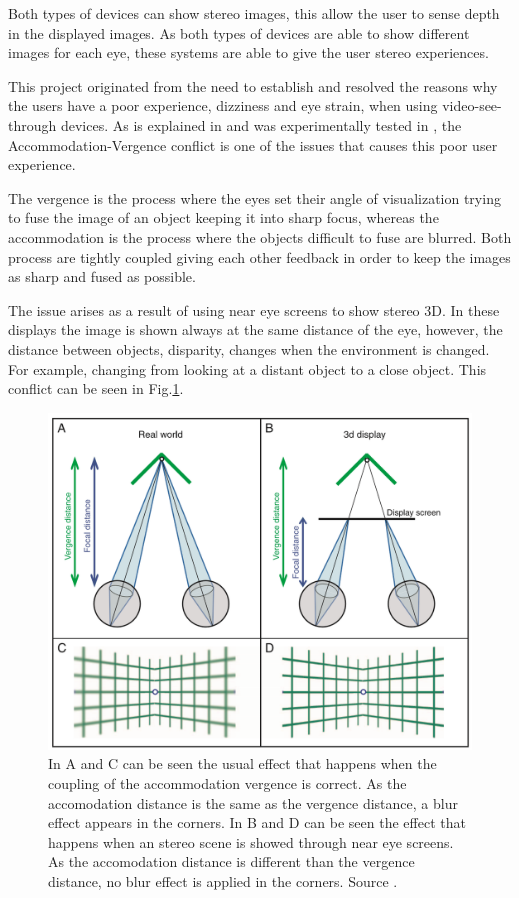 \documentclass[10pt,a4paper,twocolumn,twoside]{article}
\begin{document}
	Both types of devices can show stereo images, this allow the user to sense depth in the displayed images. 
	As both types of devices are able to show different images for each eye, these systems are able to give the user stereo experiences. 
	
	This project originated from the need to establish and resolved the reasons why the users have a poor experience, dizziness and eye strain, when using video-see-through devices. As is explained in \cite{disconfortReview} and was experimentally tested in \cite{vergenceDisconfort}, the Accommodation-Vergence conflict is one of the issues that causes this poor user experience.
	
	The vergence is the process where the eyes set their angle of visualization trying to fuse the image of an object keeping it into sharp focus, whereas the accommodation is the process where the objects difficult to fuse are blurred. Both process are tightly coupled giving each other feedback in order to keep the images as sharp and fused as possible. 
	
	The issue arises as a result of using near eye screens to show stereo 3D. In these displays the image is shown always at the same distance of the eye, however, the distance between objects, disparity,  changes when the environment is changed. For example, changing from looking at a distant object to a close object.  This conflict can be seen in Fig.\ref{fig:vergence}.
	
	\begin{figure}
		\centering
		\includegraphics[width=1\linewidth]{img/vergencia.png}
		\caption{ In A and C can be seen the usual effect that happens when the coupling of the accommodation vergence is correct. As the accomodation distance is the same as the vergence distance, a blur effect appears in the corners. In B and D can be seen the effect that happens when an stereo scene is showed through near eye screens. As the accomodation distance is different than the vergence distance, no blur effect is applied in the corners. Source \cite{vergenceDisconfort}.}
		\label{fig:vergence}
	\end{figure}
	
\end{document}
